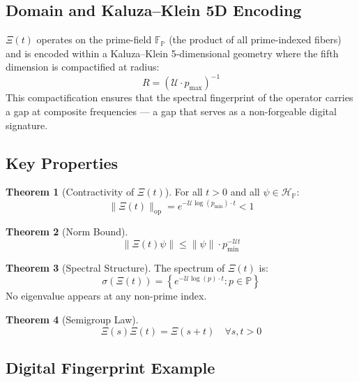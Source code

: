 \documentclass[12pt,letterpaper]{article}
\theoremstyle{definition}
\newtheorem{theorem}{Theorem}[section]
\theoremstyle{remark}
\begin{document}
\subsection{Domain and Kaluza--Klein 5D Encoding}

$\Xi(t)$ operates on the prime-field $\mathbb{F}_\mathbb{P}$ (the product of all prime-indexed fibers) and is encoded within a Kaluza--Klein 5-dimensional geometry where the fifth dimension is compactified at radius:
\begin{equation}
R = \left(\mathcal{U} \cdot p_{\max}\right)^{-1}
\end{equation}
This compactification ensures that the spectral fingerprint of the operator carries a gap at composite frequencies --- a gap that serves as a non-forgeable digital signature.

\subsection{Key Properties}

\begin{theorem}[Contractivity of $\Xi(t)$]
For all $t > 0$ and all $\psi \in \mathcal{H}_\mathbb{P}$:
\begin{equation}
\|\Xi(t)\|_{\mathrm{op}} = e^{-\mathcal{U}\log(p_{\min})\cdot t} < 1
\end{equation}
\end{theorem}

\begin{theorem}[Norm Bound]
\begin{equation}
\|\Xi(t)\psi\| \leq \|\psi\| \cdot p_{\min}^{-\mathcal{U}t}
\end{equation}
\end{theorem}

\begin{theorem}[Spectral Structure]
The spectrum of $\Xi(t)$ is:
\begin{equation}
\sigma(\Xi(t)) = \left\{e^{-\mathcal{U}\log(p)\cdot t} : p \in \mathbb{P}\right\}
\end{equation}
No eigenvalue appears at any non-prime index.
\end{theorem}

\begin{theorem}[Semigroup Law]
\begin{equation}
\Xi(s)\Xi(t) = \Xi(s+t) \quad \forall s,t > 0
\end{equation}
\end{theorem}

\subsection{Digital Fingerprint Example}
\end{document}
